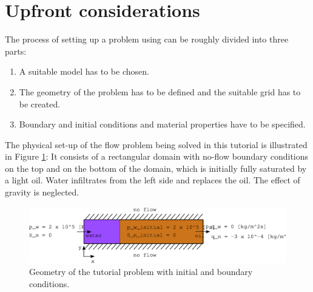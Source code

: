 \section{Upfront considerations}
\label{tutorial-coupled}

The process of setting up a problem using \eWoms can be roughly
divided into three parts:
\begin{enumerate}
\item A suitable model has to be chosen.
\item The geometry of the problem has to be defined and the suitable
  grid has to be created.
\item Boundary and initial conditions and material properties have to
  be specified.
\end{enumerate}

The physical set-up of the flow problem being solved in this tutorial
is illustrated in Figure \ref{tutorial-coupled:problemfigure}: It
consists of a rectangular domain with no-flow boundary conditions on
the top and on the bottom of the domain, which is initially fully
saturated by a light oil. Water infiltrates from the left side and
replaces the oil. The effect of gravity is neglected.

\begin{figure}[ht]
\centering
\includegraphics[width=0.9\linewidth,keepaspectratio]{EPS/tutorial-problemconfiguration}
\caption{Geometry of the tutorial problem with initial and boundary conditions.}\label{tutorial-coupled:problemfigure}
\end{figure}

